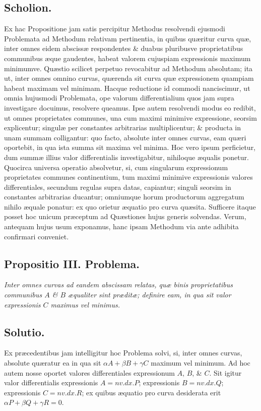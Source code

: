 \subsection*{Scholion.}
Ex hac Propositione jam satis percipitur Methodus resolvendi ejusmodi Problemata ad Methodum relativam pertinentia, in quibus quæritur curva quæ, inter omnes eidem abscissæ respondentes \& duabus pluribusve proprietatibus communibus æque gaudentes, habeat valorem cujuspiam expressionis maximum minimumve. Quæstio scilicet perpetuo revocabitur ad Methodum absolutam; ita ut, inter omnes omnino curvas, quærenda sit curva quæ expressionem quampiam habeat maximam vel minimam. Hacque reductione id commodi nanciscimur, ut omnia hujusmodi Problemata, ope valorum differentialium quos jam supra investigare docuimus, resolvere queamus. Ipse autem resolvendi modus eo redibit, ut omnes proprietates communes, una cum maximi minimive expressione, seorsim explicentur; singulæ per constantes arbitrarias multiplicentur; \& producta in unam summam colligantur: quo facto, absolute inter omnes curvas, eam quæri oportebit, in qua ista summa sit maxima vel minima. Hoc vero ipsum perficietur, dum summæ illius valor differentialis investigabitur, nihiloque æqualis ponetur. Quocirca universa operatio absolvetur, si, cum singularum expressionum proprietates communes continentium, tum maximi minimive expressionis valores differentiales, secundum regulas supra datas, capiantur; singuli seorsim in constantes arbitrarias ducantur; omniumque horum productorum aggregatum nihilo æquale ponatur: ex quo orietur æquatio pro curva quæsita. Sufficere itaque posset hoc unicum præceptum ad Quæstiones hujus generis solvendas. Verum, antequam hujus usum exponamus, hanc ipsam Methodum via ante adhibita confirmari conveniet.
\subsection*{Propositio III. Problema.}
\textit{Inter omnes curvas ad eandem abscissam relatas, quæ binis proprietatibus communibus $A$ \& $B$ æqualiter sint præditæ; definire eam, in qua sit valor expressionis $C$ maximus vel minimus.}
\subsection*{Solutio.}
Ex præcedentibus jam intelligitur hoc Problema solvi, si, inter omnes curvas, absolute quæratur ea in qua sit $\alpha A+\beta B+\gamma C$ maximum vel minimum. Ad hoc autem nosse oportet valores differentiales expressionum $A$, $B$, \& $C$. Sit igitur valor differentialis expressionis $A=nv.dx.P$; expressionis $B=nv.dx.Q$; expressionis $C=nv.dx.R$; ex quibus æquatio pro curva desiderata erit $\alpha P+\beta Q+\gamma R=0$.

